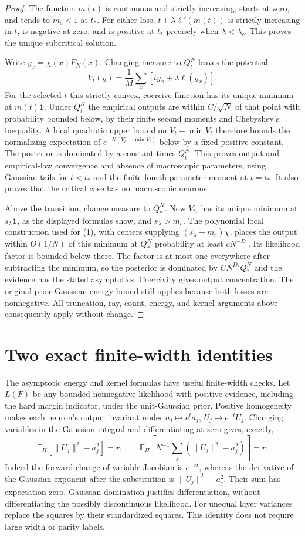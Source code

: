 \documentclass[11pt]{article}
\newcommand{\E}{\mathbb E}\newcommand{\Pp}{\mathbb P}
\newcommand{\one}{\mathbf1}
\begin{document}
\begin{proof}
The function $m(t)$ is continuous and strictly increasing, starts at
zero, and tends to $m_c<1$ at $t_*$. For either loss,
$t+\lambda\ell'(m(t))$ is strictly increasing in $t$, is negative
at zero, and is positive at $t_*$ precisely when
$\lambda<\lambda_c$. This proves the unique subcritical solution.

Write $y_x=\chi(x)F_N(x)$. Changing measure to $Q_t^N$ leaves the
potential
\[
 V_t(y)=\frac1M\sum_x[t y_x+\lambda\ell(y_x)].
\]
For the selected $t$ this strictly convex, coercive function has its
unique minimum at $m(t)\one$. Under $Q_t^N$ the empirical outputs
are within $C/\sqrt N$ of that point with probability bounded below,
by their finite second moments and Chebyshev's inequality. A local
quadratic upper bound on $V_t-\min V_t$ therefore bounds the
normalizing expectation of $e^{-N(V_t-\min V_t)}$ below by a fixed
positive constant. The posterior is dominated by a constant times
$Q_t^N$. This proves output and empirical-law convergence and absence
of macroscopic parameters, using Gaussian tails for $t<t_*$ and the
finite fourth parameter moment at $t=t_*$. It also proves that the
critical case has no macroscopic neurons.

Above the transition, change measure to $Q_*^N$. Now $V_{t_*}$ has
its unique minimum at $s_\lambda\one$, as the displayed formulas
show, and $s_\lambda>m_c$. The polynomial local construction used
for (1), with centers supplying $(s_\lambda-m_c)\chi$, places the
output within $O(1/N)$ of this minimum at $Q_*^N$ probability
at least $cN^{-D_r}$. Its likelihood factor is bounded below there.
The factor is at most one everywhere after subtracting the minimum,
so the posterior is dominated by $CN^{D_r}Q_*^N$ and the evidence
has the stated asymptotics. Coercivity gives output concentration.
The original-prior Gaussian energy bound still applies because both
losses are nonnegative. All truncation, ray, count, energy, and kernel
arguments above consequently apply without change.
\end{proof}

\section{Two exact finite-width identities}
The asymptotic energy and kernel formulas have useful finite-width
checks. Let $L(F)$ be any bounded nonnegative likelihood with positive
evidence, including the hard margin indicator, under the unit-Gaussian
prior. Positive homogeneity makes each neuron's output invariant under
$a_j\mapsto e^ta_j$, $U_j\mapsto e^{-t}U_j$. Changing variables in the
Gaussian integral and differentiating at zero gives, exactly,
\[
 \E_{\Pi}[\|U_j\|^2-a_j^2]=r,\qquad
 \E_{\Pi}\left[N^{-1}\sum_j(\|U_j\|^2-a_j^2)\right]=r.       \tag{11}
\]
Indeed the forward change-of-variable Jacobian is $e^{-rt}$,
whereas the derivative of the Gaussian exponent after the substitution
is $\|U_j\|^2-a_j^2$. Their sum has expectation zero.
Gaussian domination justifies differentiation,
without differentiating the possibly discontinuous likelihood.
For unequal layer variances replace the squares by their standardized
squares. This identity does not require large width or parity labels.
\end{document}
